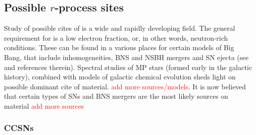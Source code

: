 

\subsection{Possible $r$-process sites}

Study of possible cites of \rproc{} is a wide and rapidly developing field. The general requirement 
for \rproc{} is a low electron fraction, or, in other words, neutron-rich conditions. These can be 
found in a various places for certain models of Big Bang, that include inhomogeneities, 
\ac{BNS} and \ac{NSBH} mergers and \ac{SN} ejecta (see \citet{Mathews:1990} and references therein). 
%
Spectral studies of \ac{MP} stars (formed early in the galactic history), combined with models of 
galactic chemical evolution sheds light on possible dominant cite of \rproc{} material. 
\textcolor{red}{add more sources/models}. 
It is now believed that certain types of \acp{SN} and \ac{BNS} mergers are the most likely 
sources on \rproc{} material \citep{Mathews:1990,Thielemann:2011} \textcolor{red}{add more sources}


\subsubsection{\acp{CCSN}}

